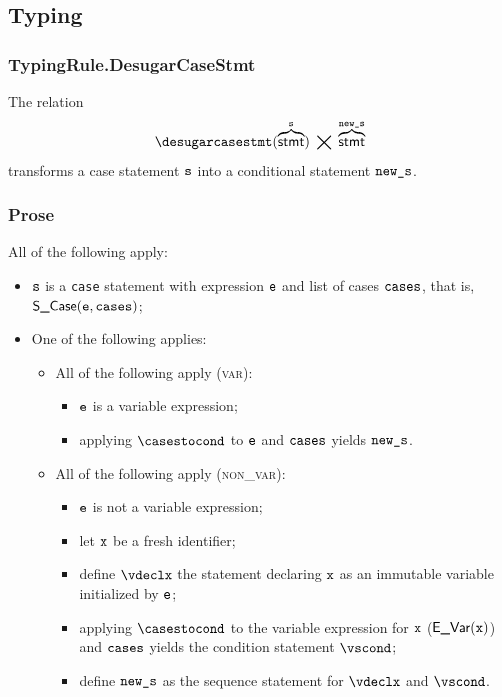 \subsection{Typing}
\subsubsection{TypingRule.DesugarCaseStmt\label{sec:TypingRule.DesugarCaseStmt}}
\hypertarget{def-desugarcasestmt}{}
The relation
\[
\desugarcasestmt(\overname{\stmt}{\vs}) \;\aslrel\; \overname{\stmt}{\news}
\]
transforms a case statement $\texttt{s}$ into a conditional statement $\texttt{new\_s}$.

\subsubsection{Prose}
All of the following apply:
\begin{itemize}
  \item $\texttt{s}$ is a \texttt{case} statement with expression $\texttt{e}$ and list of cases $\texttt{cases}$, that is, \\
        $\textsf{S\_Case}(\texttt{e}, \texttt{cases})$;
  \item One of the following applies:
  \begin{itemize}
    \item All of the following apply (\textsc{var}):
    \begin{itemize}
      \item $\texttt{e}$ is a variable expression;
      \item applying $\casestocond$ to $\texttt{e}$ and $\texttt{cases}$ yields $\texttt{new\_s}$.
    \end{itemize}

    \item All of the following apply (\textsc{non\_var}):
    \begin{itemize}
      \item $\texttt{e}$ is not a variable expression;
      \item let $\texttt{x}$ be a fresh identifier;
      \item define $\vdeclx$ the statement declaring $\texttt{x}$ as an immutable variable initialized by $\texttt{e}$;
      \item applying $\casestocond$ to the variable expression for $\texttt{x}$ ($\textsf{E\_Var}(\texttt{x})$) and $\texttt{cases}$ yields
            the condition statement $\vscond$;
      \item define $\texttt{new\_s}$ as the sequence statement for $\vdeclx$ and $\vscond$.
    \end{itemize}
  \end{itemize}
\end{itemize}

